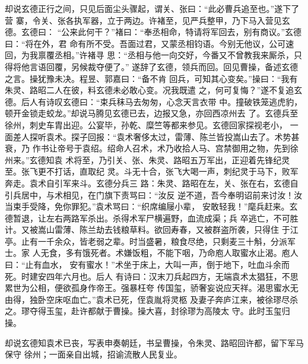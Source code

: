 却说玄德正行之间，只见后面尘头骤起，谓关、张曰：“此必曹兵追至也。”遂下了营
寨，令关、张各执军器，立于两边。许褚至，见严兵整甲，乃下马入营见玄德。玄德曰：
“公来此何干？”褚曰：“奉丞相命，特请将军回去，别有商议。”玄德曰：“将在外，君
命有所不受。吾面过君，又蒙丞相钧语。今别无他议，公可速回，为我禀覆丞相。”许褚寻
思：“丞相与他一向交好，今番又不曾教我来厮杀，只得将他言语回覆，另候裁夺便了。”
遂辞了玄德，领兵而回。回见曹操，备述玄德之言。操犹豫未决。程昱、郭嘉曰：“备不肯
回兵，可知其心变矣。”操曰：“我有朱灵、路昭二人在彼，料玄德未必敢心变。况我既遣
之，何可复悔？”遂不复追玄德。后人有诗叹玄德曰：“束兵秣马去匆匆，心念天言衣带
中。撞破铁笼逃虎豹，顿开金锁走蛟龙。”却说马腾见玄德已去，边报又急，亦回西凉州去
了。玄德兵至徐州，刺史车胄出迎。公宴毕，孙乾、糜竺等都来参见。玄德回家探视老小，
一面差人探听袁术。探子回报：“袁术奢侈太过，雷薄、陈兰皆投嵩山去了。术势甚衰，乃
作书让帝号于袁绍。绍命人召术，术乃收拾人马、宫禁御用之物，先到徐州来。”玄德知袁
术将至，乃引关、张、朱灵、路昭五万军出，正迎着先锋纪灵至。张飞更不打话，直取纪
灵。斗无十合，张飞大喝一声，刺纪灵于马下，败军奔走。袁术自引军来斗。玄德分兵三
路：朱灵、路昭在左，关、张在右，玄德自引兵居中，与术相见，在门旗下责骂曰：“汝反
逆不道，吾今奉明诏前来讨汝！汝当束手受降，免你罪犯。”袁术骂曰：“织席编屦小辈，
安敢轻我！”麾兵赶来。玄德暂退，让左右两路军杀出。杀得术军尸横遍野，血流成渠；兵
卒逃亡，不可胜计。又被嵩山雷薄、陈兰劫去钱粮草料。欲回寿春，又被群盗所袭，只得住
于江亭。止有一千余众，皆老弱之辈。时当盛暑，粮食尽绝，只剩麦三十斛，分派军士。家
人无食，多有饿死者。术嫌饭粗，不能下咽，乃命庖人取蜜水止渴。庖人曰：“止有血水，
安有蜜水！”术坐于床上，大叫一声，倒于地下，吐血斗余而死。时建安四年六月也。后人
有诗曰：汉末刀兵起四方，无端袁术太猖狂，不思累世为公相，便欲孤身作帝王。强暴枉夸
传国玺，骄奢妄说应天祥。渴思蜜水无由得，独卧空床呕血亡。”袁术已死，侄袁胤将灵柩
及妻子奔庐江来，被徐璆尽杀之。璆夺得玉玺，赴许都献于曹操。操大喜，封徐璆为高陵太
守。此时玉玺归操。

却说玄德知袁术已丧，写表申奏朝廷，书呈曹操，令朱灵、路昭回许都，留下军马保守
徐州；一面亲自出城，招谕流散人民复业。


